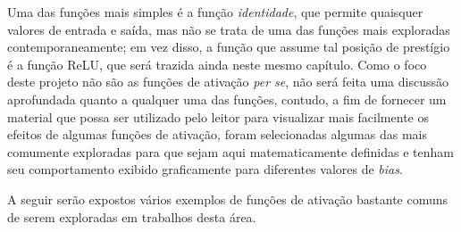 Uma das funções mais simples é a função \textit{identidade}, que permite quaisquer valores de entrada e saída, mas não se trata de uma das funções mais exploradas contemporaneamente; em vez disso, a função que assume tal posição de prestígio é a função ReLU, que será trazida ainda neste mesmo capítulo. Como o foco deste projeto não são as funções de ativação \textit{per se}, não será feita uma discussão aprofundada quanto a qualquer uma das funções, contudo, a fim de fornecer um material que possa ser utilizado pelo leitor para visualizar mais facilmente os efeitos de algumas funções de ativação, foram selecionadas algumas das mais comumente exploradas para que sejam aqui matematicamente definidas e tenham seu comportamento exibido graficamente para diferentes valores de \textit{bias}.

A seguir serão expostos vários exemplos de funções de ativação bastante comuns de serem exploradas em trabalhos desta área.



